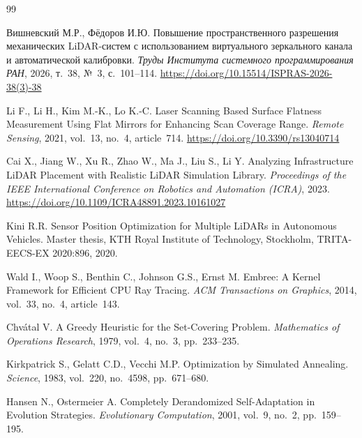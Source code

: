 \documentclass{misisarticle}
\begin{document}
\begin{thebibliography}{99}

 Вишневский М.Р., Фёдоров И.Ю. Повышение пространственного разрешения механических LiDAR-систем с использованием виртуального зеркального канала и автоматической калибровки. \textit{Труды Института системного программирования РАН}, 2026, т.~38, №~3, с.~101--114. \url{https://doi.org/10.15514/ISPRAS-2026-38(3)-38}

 Li F., Li H., Kim M.-K., Lo K.-C. Laser Scanning Based Surface Flatness Measurement Using Flat Mirrors for Enhancing Scan Coverage Range. \textit{Remote Sensing}, 2021, vol.~13, no.~4, article~714. \url{https://doi.org/10.3390/rs13040714}

 Cai X., Jiang W., Xu R., Zhao W., Ma J., Liu S., Li Y. Analyzing Infrastructure LiDAR Placement with Realistic LiDAR Simulation Library. \textit{Proceedings of the IEEE International Conference on Robotics and Automation (ICRA)}, 2023. \url{https://doi.org/10.1109/ICRA48891.2023.10161027}

 Kini R.R. Sensor Position Optimization for Multiple LiDARs in Autonomous Vehicles. Master thesis, KTH Royal Institute of Technology, Stockholm, TRITA-EECS-EX 2020:896, 2020.

 Wald I., Woop S., Benthin C., Johnson G.S., Ernst M. Embree: A Kernel Framework for Efficient CPU Ray Tracing. \textit{ACM Transactions on Graphics}, 2014, vol.~33, no.~4, article~143.

 Chv\'{a}tal V. A Greedy Heuristic for the Set-Covering Problem. \textit{Mathematics of Operations Research}, 1979, vol.~4, no.~3, pp.~233--235.

 Kirkpatrick S., Gelatt C.D., Vecchi M.P. Optimization by Simulated Annealing. \textit{Science}, 1983, vol.~220, no.~4598, pp.~671--680.

 Hansen N., Ostermeier A. Completely Derandomized Self-Adaptation in Evolution Strategies. \textit{Evolutionary Computation}, 2001, vol.~9, no.~2, pp.~159--195.

\end{thebibliography}
\end{document}

